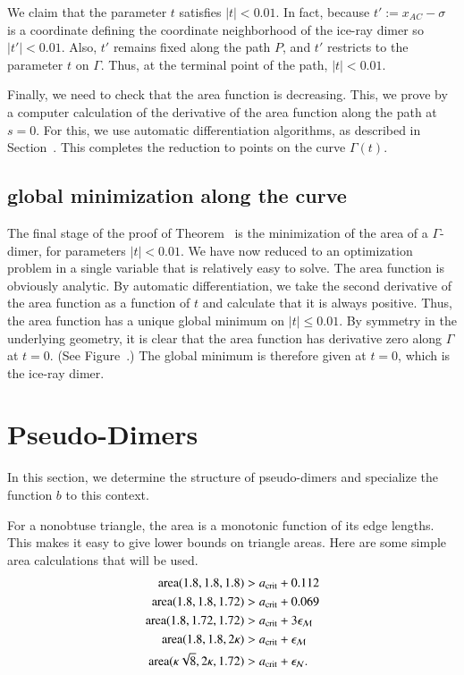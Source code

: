 We claim that the parameter $t$ satisfies $|t|<0.01$.  In fact,
because $t' := x_{AC}-\sigma$ is a coordinate defining the coordinate
neighborhood of the ice-ray dimer so $|t'|<0.01$.  Also, $t'$ remains
fixed along the path $P$, and $t'$ restricts to the parameter $t$ on
$\Gamma$.  Thus, at the terminal point of the path, $|t|<0.01$.

Finally, we need to check that the area function is decreasing. This,
we prove by a computer calculation of the derivative of the area
function along the path at $s=0$.  For this, we use automatic
differentiation algorithms, as described in
Section~.  This completes the reduction to points
on the curve $\Gamma(t)$.

\subsection{global minimization along the curve}

The final stage of the proof of Theorem~ is the
minimization of the area of a $\Gamma$-dimer, for parameters
$|t|<0.01$.  We have now reduced to an optimization problem in a
single variable that is relatively easy to solve.  The area function
is obviously analytic.  By automatic differentiation, we take the
second derivative of the area function as a function of $t$ and
calculate that it is always positive.  Thus, the area function has a
unique global minimum on $|t|\le 0.01$.  By symmetry in the underlying
geometry, it is clear that the area function has derivative zero along
$\Gamma$ at $t=0$.  (See Figure~.) The global
minimum is therefore given at $t=0$, which is the ice-ray dimer.

\section{Pseudo-Dimers}

In this section, we determine the structure of pseudo-dimers and
specialize the function $b$ to this context.

For a nonobtuse triangle, the area is a monotonic function of its edge
lengths.  This makes it easy to give lower bounds on triangle areas.
Here are some simple area calculations that will be used.
\begin{align*}
{\operatorname{area}}(1.8,1.8,1.8) &> a_\text{crit} + 0.112\\
{\operatorname{area}}(1.8,1.8,1.72) &> a_\text{crit} + 0.069\\
{\operatorname{area}}(1.8,1.72,1.72) &> a_\text{crit} + 3\epsilon_{\mathcal M}\\
{\operatorname{area}}(1.8,1.8,2\kappa) &> a_\text{crit} + \epsilon_{\mathcal M}\\
{\operatorname{area}}(\kappa\sqrt8,2\kappa,1.72) &> a_\text{crit} +\epsilon_{\mathcal N}.
\end{align*}

